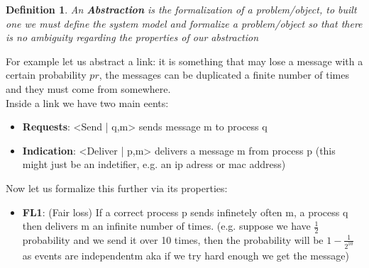 \documentclass[11pt, a4paper]{article}
\newtheorem{defn}{Definition}
\begin{document}
\begin{defn}
    An \textbf{Abstraction} is the formalization of a problem/object, to built one we must define the system model and formalize a problem/object so that there is no ambiguity regarding the properties of our abstraction
\end{defn}
For example let us abstract a link: it is something that may lose a message with a certain probability $pr$, the messages can be duplicated a finite number of times and they must come from somewhere.\\
Inside a link we have two main eents:
\begin{itemize}
    \item \textbf{Requests}: <Send | q,m> sends message m to process q
    \item \textbf{Indication}: <Deliver | p,m> delivers a message m from process p (this might just be an indetifier, e.g. an ip adress or mac address)
\end{itemize}
Now let us formalize this further via its properties:
\begin{itemize}
    \item \textbf{FL1}: (Fair loss) If a correct process p sends infinetely often m, a process q then delivers m an infinite number of times. (e.g. suppose we have $\frac{1}{2}$ probability and we send it over 10 times, then the probability will be $1 - \frac{1}{2^{10}}$ as events are independentm aka if we try hard enough we get the message)
\end{itemize}
\end{document}
